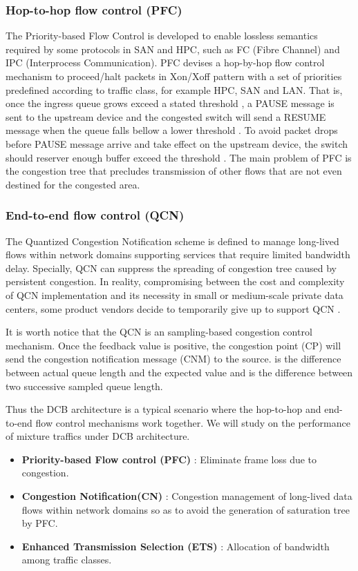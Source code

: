 \documentclass[]{sig-alternate-10pt}
\begin{document}
\subsubsection{Hop-to-hop flow control (PFC)}
The Priority-based Flow Control \cite{ieee8021qbb} is developed to enable lossless semantics required by some protocols in SAN and HPC, such as FC (Fibre Channel) and IPC (Interprocess Communication). PFC devises a hop-by-hop flow control mechanism to proceed/halt packets in Xon/Xoff pattern with a set of priorities predefined according to traffic class, for example HPC, SAN and LAN.
That is, once the ingress queue grows exceed a stated threshold , a PAUSE message is sent to the upstream device and the congested switch will send a RESUME message when the queue falls bellow a lower threshold .
To avoid packet drops before PAUSE message arrive and take effect on the upstream device, the switch should reserver enough buffer exceed the threshold .
The main problem of PFC is the congestion tree that precludes transmission of other flows that are not even destined for the congested area.
\subsubsection{End-to-end flow control (QCN)}
The Quantized Congestion Notification \cite{ieee8021qau} scheme is defined to manage long-lived flows within network domains supporting services that require limited bandwidth delay. Specially, QCN can suppress the spreading of congestion tree caused by persistent congestion. In reality, compromising between the cost and complexity of QCN implementation and its necessity in small or medium-scale private data centers, some product vendors decide to temporarily give up to support QCN \cite{what}.


It is worth notice that the QCN is an sampling-based congestion control mechanism. Once the feedback value  is positive, the congestion point (CP) will send the congestion notification message (CNM) to the source.  is the difference between actual queue length and the expected value and  is the difference between two successive sampled queue length.

Thus the DCB architecture is a typical scenario where the hop-to-hop and end-to-end flow control mechanisms work together. We will study on the performance of mixture traffics under DCB architecture.


\iffalse
\begin{itemize}
	\item \textbf{Priority-based Flow control (PFC)}  : Eliminate frame loss due to congestion.
    \item  \textbf{Congestion Notification(CN)} : Congestion management of long-lived data flows within network domains so as to avoid the generation of saturation tree by PFC.	
	\item \textbf{Enhanced Transmission Selection (ETS)} : Allocation of bandwidth among traffic classes.
\end{itemize}
\end{document}
